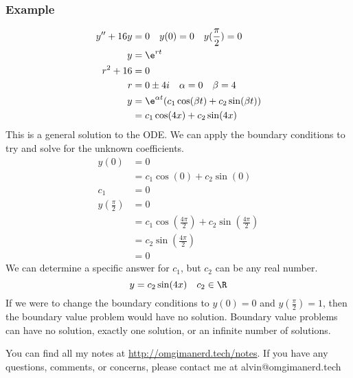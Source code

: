 \documentclass{math}
\begin{document}
\subsubsection*{Example}
\begin{align*}
  y''+16y &= 0 \quad y(0) = 0 \quad y(\frac{\pi}{2}) = 0 \\
  y &= \e^{rt} \\
  r^2+16 &= 0 \\
  r &= 0\pm4i \quad \alpha = 0 \quad \beta = 4 \\
  y &= \e^{\alpha t}(c_1\cos(\beta t)+c_2\sin(\beta t)) \\
  &= c_1\cos(4x)+c_2\sin(4x)
\end{align*}
This is a general solution to the ODE. We can apply the boundary conditions to
try and solve for the unknown coefficients.
\begin{align*}
  y(0) &= 0 \\
  &= c_1\cos(0)+c_2\sin(0) \\
  c_1 &= 0 \\
  y(\frac{\pi}{2}) &= 0 \\
  &= c_1\cos\left(\frac{4\pi}{2}\right)+c_2\sin\left(\frac{4\pi}{2}\right) \\
  &= c_2\sin\left(\frac{4\pi}{2}\right) \\
  &= 0
\end{align*}
We can determine a specific answer for \( c_1 \), but \( c_2 \) can be any real
number.
\[ y = c_2\sin(4x) \quad c_2\in\R \]
If we were to change the boundary conditions to \( y(0) = 0 \) and
\( y(\frac{\pi}{2}) = 1 \), then the boundary value problem would have no
solution. Boundary value problems can have no solution, exactly one solution,
or an infinite number of solutions.

\begin{center}
  You can find all my notes at \url{http://omgimanerd.tech/notes}. If you have
  any questions, comments, or concerns, please contact me at
  alvin@omgimanerd.tech
\end{center}
\end{document}
